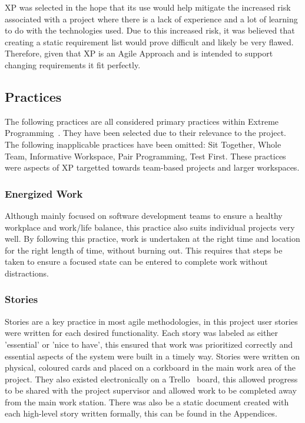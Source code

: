XP was selected in the hope that its use would help mitigate the increased risk associated with a project where there is a lack of experience and a lot of learning to do with the technologies used. Due to this increased risk, it was believed that creating a static requirement list would prove difficult and likely be very flawed. Therefore, given that XP is an Agile Approach and is intended to support changing requirements it fit perfectly.

\subsection{Practices}
The following practices are all considered primary practices within Extreme Programming~\cite[Ch.~7]{xp_explained_ref}. They have been selected due to their relevance to the project. The following inapplicable practices have been omitted: Sit Together, Whole Team, Informative Workspace, Pair Programming, Test First. These practices were aspects of XP targetted towards team-based projects and larger workspaces.

\subsubsection{Energized Work}
Although mainly focused on software development teams to ensure a healthy workplace and work/life balance, this practice also suits individual projects very well. By following this practice, work is undertaken at the right time and location for the right length of time, without burning out. This requires that steps be taken to ensure a focused state can be entered to complete work without distractions. 

\subsubsection{Stories}
Stories are a key practice in most agile methodologies, in this project user stories were written for each desired functionality. Each story was labeled as either 'essential' or 'nice to have', this ensured that work was prioritized correctly and essential aspects of the system were built in a timely way. Stories were written on physical, coloured cards and placed on a corkboard in the main work area of the project. They also existed electronically on a Trello~\cite{ref_trello} board, this allowed progress to be shared with the project supervisor and allowed work to be completed away from the main work station. There was also be a static document created with each high-level story written formally, this can be found in the Appendices.

